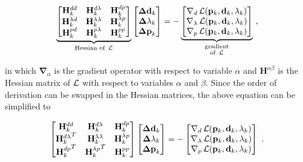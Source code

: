 \begin{equation}
  \underbrace{
    \begin{bmatrix}
      \mathbf{H}^{dd}_k & \mathbf{H}^{d\lambda}_k & \mathbf{H}^{dp}_k \\
      \mathbf{H}^{\lambda d}_k & \mathbf{H}^{\lambda\lambda}_k & \mathbf{H}^{\lambda p}_k \\
      \mathbf{H}^{pd}_k & \mathbf{H}^{p\lambda}_k & \mathbf{H}^{pp}_k
    \end{bmatrix}
  }_{\text{Hessian of }\operatorname{\mathcal{L}}}
  \begin{bmatrix}
    \mathbf{\Delta d}_k \\
    \mathbf{\Delta \lambda}_k \\
    \mathbf{\Delta p}_k
  \end{bmatrix}
  = -
  \underbrace{
    \begin{bmatrix}
      \mathbf{\nabla}_d\operatorname{\mathcal{L}}(\mathbf{p}_k,\mathbf{d}_k,\mathbf{\lambda}_k) \\
      \mathbf{\nabla}_\lambda\operatorname{\mathcal{L}}(\mathbf{p}_k,\mathbf{d}_k,\mathbf{\lambda}_k) \\
      \mathbf{\nabla}_p\operatorname{\mathcal{L}}(\mathbf{p}_k,\mathbf{d}_k,\mathbf{\lambda}_k)
    \end{bmatrix}
  }_{\substack{\text{gradient}\\ \text{of }\operatorname{\mathcal{L}}}}
  \ ,
\end{equation}

\noindent
in which $\mathbf{\nabla}_\alpha$ is the gradient operator with respect to
variable $\alpha$ and
$\mathbf{H}^{\alpha\beta}$ is the Hessian matrix of $\operatorname{\mathcal{L}}$ with respect to
variables $\alpha$ and $\beta$.
Since the order of derivation can be swapped in the Hessian matrices, the above
equation can be simplified to

\begin{equation}
    \begin{bmatrix}
      \mathbf{H}^{dd}_k & \mathbf{H}^{d\lambda}_k & \mathbf{H}^{dp}_k \\
      {\mathbf{H}^{d\lambda}_k}^T & \mathbf{H}^{\lambda\lambda}_k & \mathbf{H}^{\lambda p}_k \\
      {\mathbf{H}^{dp}_k}^T & {\mathbf{H}^{\lambda p}_k}^T & \mathbf{H}^{pp}_k
    \end{bmatrix}
  \begin{bmatrix}
    \mathbf{\Delta d}_k \\
    \mathbf{\Delta \lambda}_k \\
    \mathbf{\Delta p}_k
  \end{bmatrix}
  = -
    \begin{bmatrix}
      \mathbf{\nabla}_d\operatorname{\mathcal{L}}(\mathbf{p}_k,\mathbf{d}_k,\mathbf{\lambda}_k) \\
      \mathbf{\nabla}_\lambda\operatorname{\mathcal{L}}(\mathbf{p}_k,\mathbf{d}_k,\mathbf{\lambda}_k) \\
      \mathbf{\nabla}_p\operatorname{\mathcal{L}}(\mathbf{p}_k,\mathbf{d}_k,\mathbf{\lambda}_k)
    \end{bmatrix}
  \ .
  \label{eq:newton}
\end{equation}

